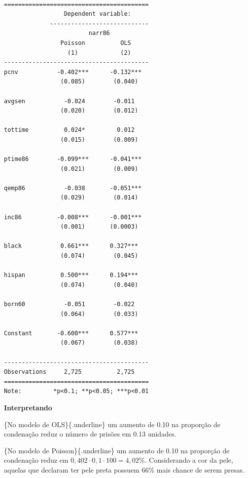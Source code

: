 \documentclass[
  letterpaper,
  DIV=11,
  numbers=noendperiod]{scrreprt}
\begin{document}
\begin{verbatim}

=========================================
                 Dependent variable:     
             ----------------------------
                        narr86           
                Poisson          OLS     
                  (1)            (2)     
-----------------------------------------
pcnv           -0.402***      -0.132***  
                (0.085)        (0.040)   
                                         
avgsen           -0.024        -0.011    
                (0.020)        (0.012)   
                                         
tottime          0.024*         0.012    
                (0.015)        (0.009)   
                                         
ptime86        -0.099***      -0.041***  
                (0.021)        (0.009)   
                                         
qemp86           -0.038       -0.051***  
                (0.029)        (0.014)   
                                         
inc86          -0.008***      -0.001***  
                (0.001)       (0.0003)   
                                         
black           0.661***      0.327***   
                (0.074)        (0.045)   
                                         
hispan          0.500***      0.194***   
                (0.074)        (0.040)   
                                         
born60           -0.051        -0.022    
                (0.064)        (0.033)   
                                         
Constant       -0.600***      0.577***   
                (0.067)        (0.038)   
                                         
-----------------------------------------
Observations     2,725          2,725    
=========================================
Note:         *p<0.1; **p<0.05; ***p<0.01
\end{verbatim}

\textbf{Interpretando}

\{No modelo de OLS\}\{.underline\} um aumento de 0.10 na proporção de
condenação reduz o número de prisões em 0.13 unidades.

\{No modelo de Poisson\}\{.underline\} um aumento de 0.10 na proporção
de condenação reduz em \(0,402 \cdot 0,1 \cdot 100=4,02\%\).
Considerando a cor da pele, aquelas que declaram ter pele preta possuem
66\% mais chance de serem presas.
\end{document}
